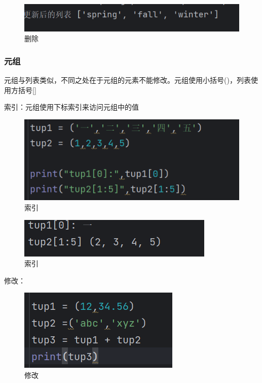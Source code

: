 \documentclass{ctexart}
\begin{document}
	\begin{figure}[H]
		\centering
		\includegraphics[scale=0.5]{3.33}
		\caption{删除}
	\end{figure}
	
	\subsubsection{元组}
	元组与列表类似，不同之处在于元组的元素不能修改。元组使用小括号()，列表使用方括号[]
	
	索引：元组使用下标索引来访问元组中的值
	
	\begin{figure}[H]
		\centering
		\includegraphics[scale=0.5]{3.34}
		\caption{索引}
	\end{figure}
	
	\begin{figure}[H]
		\centering
		\includegraphics[scale=0.5]{3.35}
		\caption{索引}
	\end{figure}
	
	修改：
	
	\begin{figure}[H]
		\centering
		\includegraphics[scale=0.5]{3.36}
		\caption{修改}
	\end{figure}
	
\end{document}
